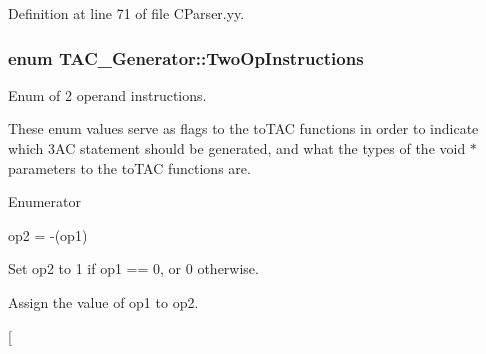 Definition at line 71 of file C\-Parser.\-yy.

\hypertarget{classTAC__Generator_a4e5a63c4a55a85d34f6ffebe5bf48129}{
\subsubsection[{Two\-Op\-Instructions}]{\setlength{\rightskip}{0pt plus 5cm}enum {\bf T\-A\-C\-\_\-\-Generator\-::\-Two\-Op\-Instructions}}}\label{classTAC__Generator_a4e5a63c4a55a85d34f6ffebe5bf48129}


Enum of 2 operand instructions. 

These enum values serve as flags to the to\-T\-A\-C functions in order to indicate which 3\-A\-C statement should be generated, and what the types of the void $\ast$ parameters to the to\-T\-A\-C functions are. \begin{Desc}
\item[Enumerator]\par
\begin{description}
\item[{\em 
\hypertarget{classTAC__Generator_a4e5a63c4a55a85d34f6ffebe5bf48129a308b492d7046c1f465e6219b0bf7bce8}{N\-E\-G}\label{classTAC__Generator_a4e5a63c4a55a85d34f6ffebe5bf48129a308b492d7046c1f465e6219b0bf7bce8}
}]op2 = -\/(op1) \item[{\em 
\hypertarget{classTAC__Generator_a4e5a63c4a55a85d34f6ffebe5bf48129a05adc6809a4b013f033bba555e2bafde}{N\-O\-T}\label{classTAC__Generator_a4e5a63c4a55a85d34f6ffebe5bf48129a05adc6809a4b013f033bba555e2bafde}
}]Set op2 to 1 if op1 == 0, or 0 otherwise. \item[{\em 
\hypertarget{classTAC__Generator_a4e5a63c4a55a85d34f6ffebe5bf48129a0aa9de21ced06e060900ea369cd0a203}{A\-S\-S\-I\-G\-N}\label{classTAC__Generator_a4e5a63c4a55a85d34f6ffebe5bf48129a0aa9de21ced06e060900ea369cd0a203}
}]Assign the value of op1 to op2. \item[{\em 
}
\end{description}
\end{Desc}

